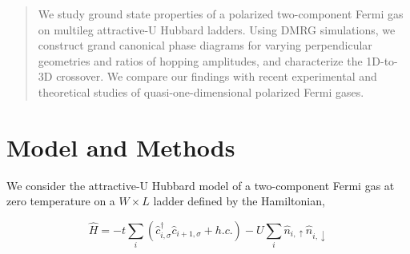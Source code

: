\documentclass[a0,portrait]{a0poster}
\begin{document}
\begin{multicols}{2} %


\color{Navy} %

\begin{abstract}

We study ground state properties of a polarized two-component Fermi gas on  multileg attractive-U Hubbard ladders. Using DMRG simulations, we construct  grand canonical phase diagrams for varying perpendicular geometries and  ratios of hopping amplitudes, and characterize the 1D-to-3D crossover.  We compare our findings with recent experimental and theoretical studies of  quasi-one-dimensional polarized Fermi gases.

\end{abstract}




\color{DarkSlateGray} %



\section*{Model and Methods}

We consider the attractive-U Hubbard model of a two-component Fermi gas at zero temperature on a $W \times L$ ladder defined by the Hamiltonian,

\begin{equation} \label{Hubbard}
\hat{H}=-t \sum_{i} \left( \hat{c}_{i,\sigma}^{\dagger} \hat{c}_{i+1, \sigma} + h.c. \right) - U \sum_{i} \hat{n}_{i, \uparrow} \hat{n}_{i, \downarrow}
\end{equation}


\end{multicols}
\end{document}
